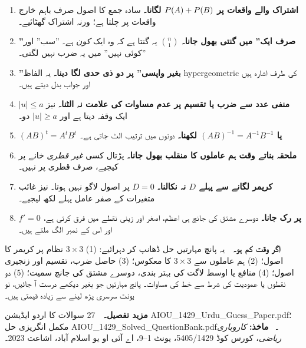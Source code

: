 \begin{enumerate}\setlength{\itemsep}{5pt}
  \item \textbf{اشتراک والے واقعات پر \(P\!\left(A\right)+P\!\left(B\right)\) لگانا۔} سادہ جمع کا
        اصول صرف باہم خارج واقعات پر چلتا ہے؛ ورنہ اشتراک گھٹائیے۔
  \item \textbf{''صرف ایک'' میں گنتی بھول جانا۔} \(\binom{n}{1}\) یہ گنتا ہے کہ
        وہ ایک \emph{کون} ہے۔ ''سب'' اور ''کوئی نہیں'' میں یہ ضرب نہیں لگتی۔
  \item \textbf{''بغیر واپسی'' پر دو ذی حدی لگا دینا۔} یہ الفاظ
        \textenglish{hypergeometric} کی طرف اشارہ ہیں اور جواب بدل دیتے ہیں۔
  \item \textbf{منفی عدد سے ضرب یا تقسیم پر عدم مساوات کی علامت نہ الٹنا۔} نیز
        \(|u|\le a\) ایک وقفہ دیتا ہے اور \(|u|\ge a\) دو۔
  \item \textbf{\((AB)^{t}=A^{t}B^{t}\) یا \((AB)^{-1}=A^{-1}B^{-1}\) لکھنا۔}
        دونوں میں ترتیب الٹ جاتی ہے۔
  \item \textbf{ملحقہ بناتے وقت ہم عاملوں کا منقلب بھول جانا۔} پڑتال کسی
        \emph{غیر قطری} خانے پر کیجیے، صرف قطری پر نہیں۔
  \item \textbf{کریمر لگانے سے پہلے \(D\) نہ نکالنا۔} \(D=0\) پر اصول لاگو نہیں
        ہوتا۔ نیز غائب متغیرات کے صفر عامل پہلے لکھ لیجیے۔
  \item \textbf{\(f'=0\) پر رک جانا۔} دوسرے مشتق کی جانچ ہی اعظم، اصغر اور زینی
        نقطے میں فرق کرتی ہے، اور اس کے نمبر الگ ملتے ہیں۔
\end{enumerate}

\vfill
\begin{center}
\begin{tcolorbox}[enhanced, colback=bmtint, colframe=bmblue, boxrule=0.5pt,
                  arc=3pt, width=0.94\linewidth,
                  left=11pt, right=11pt, top=9pt, bottom=9pt]
\small
\textbf{\color{bmblue}اگر وقت کم ہو۔}\ \
یہ پانچ مہارتیں حل ڈھانپ کر دہرائیے:
\textenglish{(1)} \(3\times3\) نظام پر کریمر کا اصول؛
\textenglish{(2)} ہم عاملوں سے \(3\times3\) کا معکوس؛
\textenglish{(3)} حاصل ضرب، تقسیم اور زنجیری اصول؛
\textenglish{(4)} منافع یا اوسط لاگت کی بہتر بندی، دوسرے مشتق کی جانچ سمیت؛
\textenglish{(5)} دو نقطوں یا عمودیت کی شرط سے خط کی مساوات۔
پانچ مہارتیں جو بغیر دیکھے درست آ جائیں، نو یونٹ سرسری پڑھ لینے سے زیادہ قیمتی
ہیں۔

\medskip
\textbf{\color{bmblue}مزید تفصیل۔}\ \
\textenglish{27} سوالات کا اردو ایڈیشن
\textenglish{AIOU\_1429\_Urdu\_Guess\_Paper.pdf}؛ مکمل انگریزی حل
\textenglish{AIOU\_1429\_Solved\_QuestionBank.pdf}۔
\ \textbf{ماخذ:} \emph{کاروباری ریاضی}، کورس کوڈ \textenglish{5405/1429}،
یونٹ \textenglish{1--9}، اے آئی او یو اسلام آباد، اشاعت \textenglish{2023}۔
\end{tcolorbox}
\end{center}
